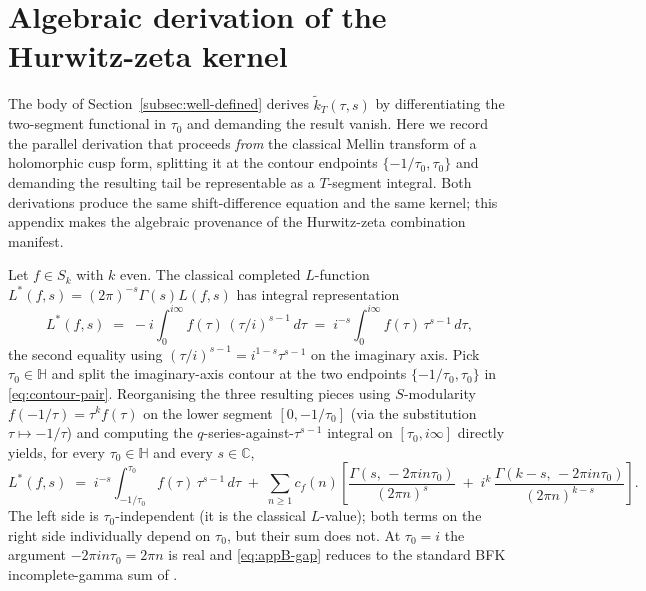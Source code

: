 \documentclass[11pt]{article}
\numberwithin{equation}{section}  %
\newcommand{\HH}{\mathbb{H}}
\newcommand{\CC}{\mathbb{C}}
\begin{document}
\section{Algebraic derivation of the Hurwitz-zeta kernel}\label{app:hurwitz-derivation}

The body of Section~\ref{subsec:well-defined} derives $\widetilde{k}_T(\tau, s)$ by
differentiating the two-segment functional in $\tau_0$ and demanding the
result vanish.  Here we record the parallel derivation that proceeds
\emph{from} the classical Mellin transform of a holomorphic cusp form,
splitting it at the contour endpoints $\{-1/\tau_0, \tau_0\}$ and
demanding the resulting tail be representable as a $T$-segment
integral.  Both derivations produce the same shift-difference equation
and the same kernel; this appendix makes the algebraic provenance of
the Hurwitz-zeta combination manifest.

Let $f \in S_k$ with $k$ even.  The classical completed $L$-function
$L^*(f, s) = (2\pi)^{-s}\Gamma(s) L(f, s)$ has integral representation
\begin{equation}
  L^*(f, s)
  \;=\; -i \int_0^{i\infty}\! f(\tau)\,(\tau/i)^{s-1}\,d\tau
  \;=\; i^{-s}\!\int_0^{i\infty}\! f(\tau)\,\tau^{s-1}\,d\tau,
\end{equation}
the second equality using $(\tau/i)^{s-1} = i^{1-s}\tau^{s-1}$ on the
imaginary axis.  Pick $\tau_0 \in \HH$ and split the imaginary-axis
contour at the two endpoints $\{-1/\tau_0, \tau_0\}$ in
\eqref{eq:contour-pair}.  Reorganising the three resulting pieces
using $S$-modularity $f(-1/\tau) = \tau^k f(\tau)$ on the lower segment
$[0, -1/\tau_0]$ (via the substitution $\tau \mapsto -1/\tau$) and
computing the $q$-series-against-$\tau^{s-1}$ integral on
$[\tau_0, i\infty]$ directly yields, for every $\tau_0 \in \HH$ and
every $s \in \CC$,
\begin{equation}\label{eq:appB-gap}
  L^*(f, s)
  \;=\; i^{-s}\!\int_{-1/\tau_0}^{\tau_0}\! f(\tau)\,\tau^{s-1}\,d\tau
  \;+\; \sum_{n \ge 1} c_f(n)\!
  \left[\frac{\Gamma(s,\,-2\pi i n \tau_0)}{(2\pi n)^s}
  \;+\; i^k\,\frac{\Gamma(k - s,\,-2\pi i n \tau_0)}{(2\pi n)^{k - s}}\right].
\end{equation}
The left side is $\tau_0$-independent (it is the classical $L$-value);
both terms on the right side individually depend on $\tau_0$, but
their sum does not.  At $\tau_0 = i$ the argument $-2\pi i n \tau_0 =
2\pi n$ is real and \eqref{eq:appB-gap} reduces to the standard BFK
incomplete-gamma sum of \cite{BFK2011}.
\end{document}
